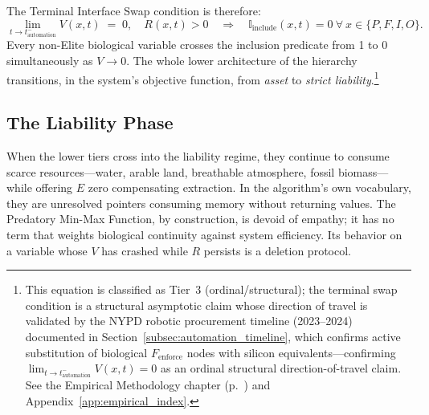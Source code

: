 The Terminal Interface Swap condition is therefore:
\begin{equation}\label{eq:14.13-terminal-interface-swap}
\lim_{t \to t_{\text{automation}}^{-}} V(x, t) \;=\; 0, \quad R(x, t) > 0 \quad \Longrightarrow \quad \mathbb{I}_{\text{include}}(x, t) = 0 \ \forall \ x \in \{P, F, I, O\}.
\end{equation}
Every non-Elite biological variable crosses the inclusion predicate from 1 to 0 simultaneously as $V \to 0$. The whole lower architecture of the hierarchy transitions, in the system's objective function, from \textit{asset} to \textit{strict liability}.\footnote{This equation is classified as Tier~3 (ordinal/structural); the terminal swap condition is a structural asymptotic claim whose direction of travel is validated by the NYPD robotic procurement timeline (2023--2024) documented in Section~\ref{subsec:automation_timeline}, which confirms active substitution of biological $F_{\text{enforce}}$ nodes with silicon equivalents---confirming $\lim_{t \to t_{\text{automation}}^{-}} V(x,t) = 0$ as an ordinal structural direction-of-travel claim. See the Empirical Methodology chapter (p.~\pageref{ch:empirical_methodology}) and Appendix~\ref{app:empirical_index}.}

\subsection{The Liability Phase}

When the lower tiers cross into the liability regime, they continue to consume scarce resources---water, arable land, breathable atmosphere, fossil biomass---while offering $E$ zero compensating extraction. In the algorithm's own vocabulary, they are unresolved pointers consuming memory without returning values. The Predatory Min-Max Function, by construction, is devoid of empathy; it has no term that weights biological continuity against system efficiency. Its behavior on a variable whose $V$ has crashed while $R$ persists is a deletion protocol.

